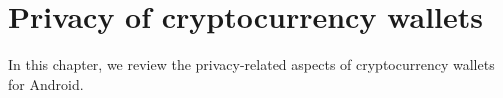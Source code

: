 
\chapter{Privacy of cryptocurrency wallets} %

\label{Chapter04_Wallets} %

In this chapter, we review the privacy-related aspects of cryptocurrency wallets for Android.